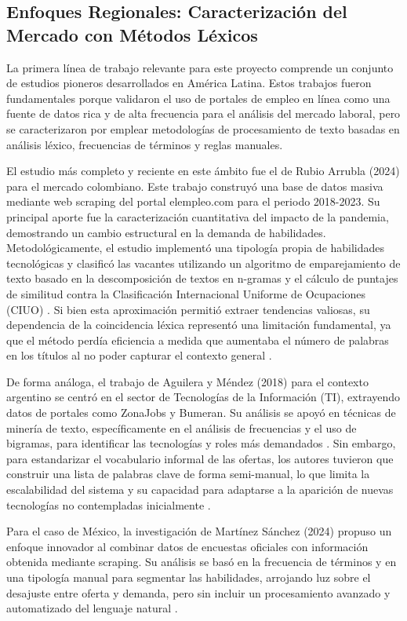 \subsection{Enfoques Regionales: Caracterización del Mercado con Métodos Léxicos}

La primera línea de trabajo relevante para este proyecto comprende un conjunto de estudios pioneros desarrollados en América Latina. Estos trabajos fueron fundamentales porque validaron el uso de portales de empleo en línea como una fuente de datos rica y de alta frecuencia para el análisis del mercado laboral, pero se caracterizaron por emplear metodologías de procesamiento de texto basadas en análisis léxico, frecuencias de términos y reglas manuales.

El estudio más completo y reciente en este ámbito fue el de Rubio Arrubla (2024) para el mercado colombiano. Este trabajo construyó una base de datos masiva mediante web scraping del portal elempleo.com para el periodo 2018-2023. Su principal aporte fue la caracterización cuantitativa del impacto de la pandemia, demostrando un cambio estructural en la demanda de habilidades. Metodológicamente, el estudio implementó una tipología propia de habilidades tecnológicas y clasificó las vacantes utilizando un algoritmo de emparejamiento de texto basado en la descomposición de textos en n-gramas y el cálculo de puntajes de similitud contra la Clasificación Internacional Uniforme de Ocupaciones (CIUO) \cite{rubio2024}. Si bien esta aproximación permitió extraer tendencias valiosas, su dependencia de la coincidencia léxica representó una limitación fundamental, ya que el método perdía eficiencia a medida que aumentaba el número de palabras en los títulos al no poder capturar el contexto general \cite{rubio2024}.

De forma análoga, el trabajo de Aguilera y Méndez (2018) para el contexto argentino se centró en el sector de Tecnologías de la Información (TI), extrayendo datos de portales como ZonaJobs y Bumeran. Su análisis se apoyó en técnicas de minería de texto, específicamente en el análisis de frecuencias y el uso de bigramas, para identificar las tecnologías y roles más demandados \cite{aguilera2018}. Sin embargo, para estandarizar el vocabulario informal de las ofertas, los autores tuvieron que construir una lista de palabras clave de forma semi-manual, lo que limita la escalabilidad del sistema y su capacidad para adaptarse a la aparición de nuevas tecnologías no contempladas inicialmente \cite{aguilera2018}.

Para el caso de México, la investigación de Martínez Sánchez (2024) propuso un enfoque innovador al combinar datos de encuestas oficiales con información obtenida mediante scraping. Su análisis se basó en la frecuencia de términos y en una tipología manual para segmentar las habilidades, arrojando luz sobre el desajuste entre oferta y demanda, pero sin incluir un procesamiento avanzado y automatizado del lenguaje natural \cite{martinez2024}.

